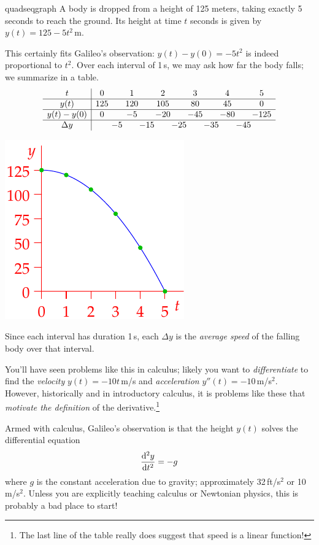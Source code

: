 \begin{example}{}{quadseqgraph}
	A body is dropped from a height of 125 meters, taking exactly 5 seconds to reach the ground. Its height at time $t$ seconds is given by $y(t)=125-5t^2$\,m.\smallbreak
	\begin{minipage}[t]{0.68\linewidth}\vspace{-8pt}
	This certainly fits Galileo's observation: $y(t)-y(0)=-5t^2$ is indeed proportional to $t^2$.\smallbreak
	Over each interval of 1\,s, we may ask how far the body falls; we summarize in a table.
	\[
		\begin{array}{c|ccccccccccc}
			t&0&&1&&2&&3&&4&&5\\\hline
			y(t)&125&&120&&105&&80&&45&&0\\\hline
			y(t)-y(0)&0&&-5&&-20&&-45&&-80&&-125\\\hline
			\Delta y&&\makebox[0pt][c]{$-5$}&&\makebox[0pt][c]{$-15$}&&\makebox[0pt][c]{$-25$}&&\makebox[0pt][c]{$-35$}&&\makebox[0pt][c]{$-45$}
		\end{array}
	\]
	\end{minipage}
	\hfill
	\begin{minipage}[t]{0.29\linewidth}\vspace{-25pt}
		\flushright
		\includegraphics{poly-quad5}
	\end{minipage}\medbreak
	Since each interval has duration 1\,s, each $\Delta y$ is the \emph{average speed} of the falling body over that interval.
\end{example}

You'll have seen problems like this in calculus; likely you want to \emph{differentiate} to find the \emph{velocity} $y(t)=-10t$\,m/s and \emph{acceleration} $y''(t)=-10$\,m/s$^2$. However, historically and in introductory calculus, it is problems like these that \emph{motivate the definition} of the derivative.\footnote{The last line of the table really does suggest that speed is a linear function!}\par
Armed with calculus, Galileo's observation is that the height $y(t)$ solves the differential equation
\[
	\diff[^2y]{t^2}=-g
\]
where $g$ is the constant acceleration due to gravity; approximately 32\,ft/s$^2$ or 10\,m/s$^2$. Unless you are explicitly teaching calculus or Newtonian physics, this is probably a bad place to start! 



